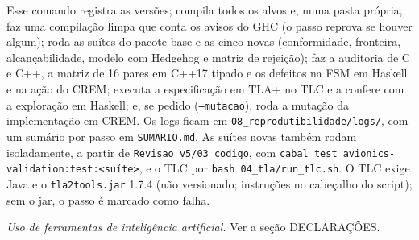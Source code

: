 \documentclass[12pt,a4paper]{article}
\begin{document}
Esse comando registra as versões; compila todos os alvos e, numa pasta própria, faz uma compilação limpa que conta os avisos do GHC (o passo reprova se houver algum); roda as suítes do pacote base e as cinco novas (conformidade, fronteira, alcançabilidade, modelo com Hedgehog e matriz de rejeição); faz a auditoria de C e C++, a matriz de 16 pares em C++17 tipado e os defeitos na FSM em Haskell e na ação do CREM; executa a especificação em TLA+ no TLC e a confere com a exploração em Haskell; e, se pedido (\texttt{--mutacao}), roda a mutação da implementação em CREM. Os logs ficam em \texttt{08\_reprodutibilidade/logs/}, com um sumário por passo em \texttt{SUMARIO.md}. As suítes novas também rodam isoladamente, a partir de \texttt{Revisao\_v5/03\_codigo}, com \texttt{cabal test avionics-validation:test:<suíte>}, e o TLC por \texttt{bash 04\_tla/run\_tlc.sh}. O TLC exige Java e o \texttt{tla2tools.jar} 1.7.4 (não versionado; instruções no cabeçalho do script); sem o jar, o passo é marcado como falha.

\textit{Uso de ferramentas de inteligência artificial.} Ver a seção DECLARAÇÕES.
\end{document}
